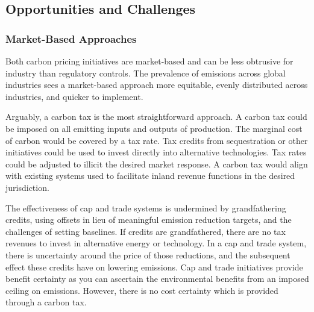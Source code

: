 \documentclass[12pt]{article}
\begin{document}
\subsection{Opportunities and Challenges}
\subsubsection{Market-Based Approaches}
Both carbon pricing initiatives are market-based and can be less obtrusive for industry than regulatory controls. 
The prevalence of emissions across global industries sees a market-based approach more equitable, evenly distributed across industries, and quicker to implement.

Arguably, a carbon tax is the most straightforward approach. 
A carbon tax could be imposed on all emitting inputs and outputs of production.
The marginal cost of carbon would be covered by a tax rate. 
Tax credits from sequestration or other initiatives could be used to invest directly into alternative technologies. 
Tax rates could be adjusted to illicit the desired market response. 
A carbon tax would align with existing systems used to facilitate inland revenue functions in the desired jurisdiction.

The effectiveness of cap and trade systems is undermined by grandfathering credits, using offsets in lieu of meaningful emission reduction targets, and the challenges of setting baselines.
If credits are grandfathered, there are no tax revenues to invest in alternative energy or technology.
In a cap and trade system, there is uncertainty around the price of those reductions, and the subsequent effect these credits have on lowering emissions.
Cap and trade initiatives provide benefit certainty as you can ascertain the environmental benefits from an imposed ceiling on emissions. 
However, there is no cost certainty which is provided through a carbon tax.
\end{document}
